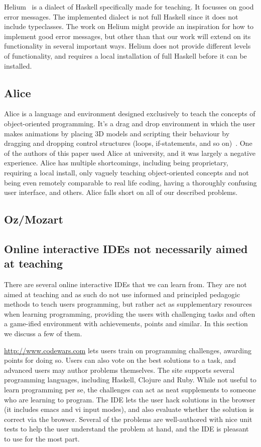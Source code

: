 Helium~\cite{DBLP:conf/haskell/HeerenLI03} is a dialect of Haskell specifically
made for teaching. It focusses on good error messages. The implemented dialect
is not full Haskell since it does not include typeclasses. The work on Helium
might provide an inspiration for how to implement good error messages, but other
than that our work will extend on its functionality in several important ways.
Helium does not provide different levels of functionality, and requires a local
installation of full Haskell before it can be installed.

\subsection{Alice}
Alice is a language and environment designed exclusively to teach the concepts 
of object-oriented programming. It's a drag and drop environment in which the 
user makes animations by placing 3D models and scripting their behaviour by 
dragging and dropping control structures (loops, if-statements, and so 
on)~\cite{alice2015whatisalice}. One of the authors of this paper used Alice 
at university, and it was largely a negative experience. Alice has multiple 
shortcomings, including being proprietary, requiring a local install, only 
vaguely teaching object-oriented concepts and not being even remotely 
comparable to real life coding, having a thoroughly confusing user interface, 
and others. Alice falls short on all of our described problems.

\subsection{Oz/Mozart}

\subsection{Online interactive IDEs not necessarily aimed at teaching}
There are several online interactive IDEs that we can learn from. They are not 
aimed at teaching and as such do not use informed and principled pedagogic 
methods to teach users programming, but rather act as supplementary resources 
when learning programming, providing the users with challenging tasks and 
often a game-ified environment with achievements, points and similar. In this 
section we discuss a few of them.

\url{http://www.codewars.com} lets users train on programming challenges, 
awarding points for doing so. Users can also vote on the best solutions to a 
task, and advanced users may author problems themselves. The site supports 
several programming languages, including Haskell, Clojure and Ruby. While not 
useful to learn programming per se, the challenges can act as neat supplements 
to someone who are learning to program. The IDE lets the user hack solutions 
in the browser (it includes emacs and vi input modes), and also evaluate 
whether the solution is correct via the browser. Several of the problems are 
well-authored with nice unit tests to help the user understand the problem at 
hand, and the IDE is pleasant to use for the most part.

